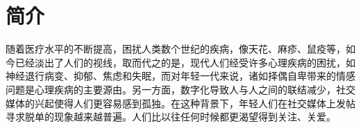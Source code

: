 
\chapter{简介}
随着医疗水平的不断提高，困扰人类数个世纪的疾病，像天花、麻疹、鼠疫等，如今已经淡出了人们的视线，取而代之的是，现代人们经受许多心理疾病的困扰，如神经退行病变、抑郁、焦虑和失眠，而对年轻一代来说，诸如择偶自卑带来的情感问题是心理疾病的主要源由\cite{chen2022nong}。另一方面，数字化导致人与人之间的联结减少，社交媒体的兴起使得人们更容易感到孤独。在这种背景下，年轻人们在社交媒体上发帖寻求脱单的现象越来越普遍。人们比以往任何时候都更渴望得到关注、关爱\cite{zhang2019gao}。